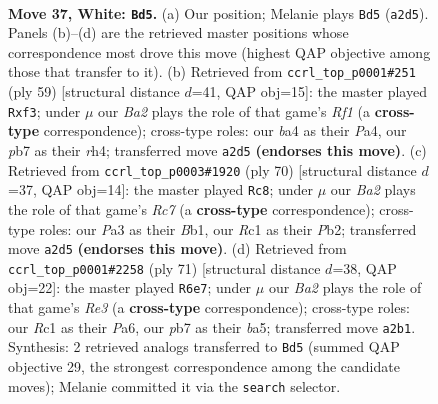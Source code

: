 \documentclass[11pt]{article}
\begin{document}
\clearpage

\begin{figure}[p]\centering
\begin{subfigure}{0.46\textwidth}\centering
\resizebox{\linewidth}{!}{%
\newchessgame
\chessboard[
  setfen={r7/pp3p2/5k2/7p/bP2P3/P5rp/B7/R1R4K w - - 0 37},
  showmover=false,
  pgfstyle=straightmove, color=movearrow, markmove={a2-d5}
]}
\caption{}
\end{subfigure}\hfill
\begin{subfigure}{0.46\textwidth}\centering
\resizebox{\linewidth}{!}{%
\newchessgame
\chessboard[
  setfen={3r1r1k/8/2R1p3/1p5P/p6R/P3PP2/8/1K6 b - - 0 30},
  showmover=false,
  pgfstyle=straightmove, color=movearrow, markmove={f8-f3}
]}
\caption{}
\end{subfigure}
\\[4pt]
\begin{subfigure}{0.46\textwidth}\centering
\resizebox{\linewidth}{!}{%
\newchessgame
\chessboard[
  setfen={3r2k1/2R2pp1/p6p/4pP2/1n2P2b/8/1P6/1BR3K1 w - - 1 36},
  showmover=false,
  pgfstyle=straightmove, color=movearrow, markmove={c7-c8}
]}
\caption{}
\end{subfigure}\hfill
\begin{subfigure}{0.46\textwidth}\centering
\resizebox{\linewidth}{!}{%
\newchessgame
\chessboard[
  setfen={4r1k1/1R3p2/p3rbp1/B6p/8/1P2P1P1/5P2/3R2K1 b - - 3 36},
  showmover=false,
  pgfstyle=straightmove, color=movearrow, markmove={e6-e7}
]}
\caption{}
\end{subfigure}
\caption{\textbf{Move 37, White: \texttt{Bd5}.} (a) Our position; Melanie plays \texttt{Bd5} (\texttt{a2d5}). Panels (b)--(d) are the retrieved master positions whose correspondence most drove this move (highest QAP objective among those that transfer to it). (b) Retrieved from \texttt{ccrl\_top\_p0001\#251} (ply 59) [structural distance $d$=41, QAP obj=15]: the master played \texttt{Rxf3}; under $\mu$ our \emph{Ba2} plays the role of that game's \emph{Rf1} (a \textbf{cross-type} correspondence); cross-type roles: our \emph{b}a4 as their \emph{P}a4, our \emph{p}b7 as their \emph{r}h4; transferred move \texttt{a2d5} \textbf{(endorses this move)}. (c) Retrieved from \texttt{ccrl\_top\_p0003\#1920} (ply 70) [structural distance $d$=37, QAP obj=14]: the master played \texttt{Rc8}; under $\mu$ our \emph{Ba2} plays the role of that game's \emph{Rc7} (a \textbf{cross-type} correspondence); cross-type roles: our \emph{P}a3 as their \emph{B}b1, our \emph{R}c1 as their \emph{P}b2; transferred move \texttt{a2d5} \textbf{(endorses this move)}. (d) Retrieved from \texttt{ccrl\_top\_p0001\#2258} (ply 71) [structural distance $d$=38, QAP obj=22]: the master played \texttt{R6e7}; under $\mu$ our \emph{Ba2} plays the role of that game's \emph{Re3} (a \textbf{cross-type} correspondence); cross-type roles: our \emph{R}c1 as their \emph{P}a6, our \emph{p}b7 as their \emph{b}a5; transferred move \texttt{a2b1}. Synthesis: 2 retrieved analogs transferred to \texttt{Bd5} (summed QAP objective 29, the strongest correspondence among the candidate moves); Melanie committed it via the \texttt{search} selector.}
\label{fig:thought-m72}
\end{figure}
\end{document}
